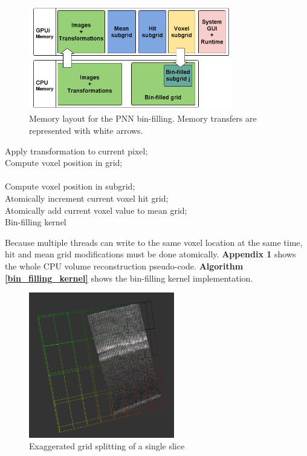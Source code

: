\documentclass[12pt,journal,compsoc]{IEEEtran}
\begin{document}
\begin{figure}[t!]
\centering
\includegraphics[width=3.5in]{bin_filling_memory}
\caption{Memory layout for the PNN bin-filling. Memory transfers are represented with white arrows.}
\label{bin_filling_memory}
\end{figure}


\begin{algorithm}
Apply transformation to current pixel;\\
Compute voxel position in grid;\\
\\
Compute voxel position in subgrid;\\
Atomically increment current voxel hit grid;\\
Atomically add current voxel value to mean grid;\\
\caption{Bin-filling kernel}
\label{bin_filling_kernel}
\end{algorithm}

Because multiple threads can write to the same voxel location at the same time, hit and mean grid modifications must be done atomically.
\textbf{Appendix 1} shows the whole CPU volume reconstruction pseudo-code. 
\textbf{Algorithm \ref{bin_filling_kernel}} shows the bin-filling kernel implementation.

\begin{figure}[t!]
\centering
\includegraphics[width=2.5in]{split1}%
\caption{Exaggerated grid splitting of a single slice}
\label{mega_grid_splitting}
\end{figure}
\end{document}
